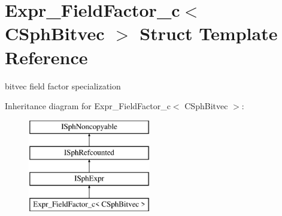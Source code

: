 \hypertarget{structExpr__FieldFactor__c_3_01CSphBitvec_01_4}{\section{Expr\-\_\-\-Field\-Factor\-\_\-c$<$ C\-Sph\-Bitvec $>$ Struct Template Reference}
\label{structExpr__FieldFactor__c_3_01CSphBitvec_01_4}
}


bitvec field factor specialization  


Inheritance diagram for Expr\-\_\-\-Field\-Factor\-\_\-c$<$ C\-Sph\-Bitvec $>$\-:\begin{figure}[H]
\begin{center}
\leavevmode
\includegraphics[height=4.000000cm]{structExpr__FieldFactor__c_3_01CSphBitvec_01_4}
\end{center}
\end{figure}
